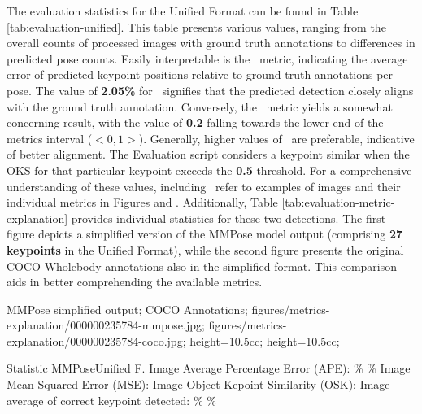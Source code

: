 The evaluation statistics for the Unified Format can be found in Table [tab:evaluation-unified]. This table presents various values, ranging from the overall counts of processed images with ground truth annotations to differences in predicted pose counts. Easily interpretable is the \APE\ metric, indicating the average error of predicted keypoint positions relative to ground truth annotations per pose. The value of {\bf 2.05\%} for \APE\ signifies that the predicted detection closely aligns with the ground truth annotation. Conversely, the \OKS\ metric yields a somewhat concerning result, with the value of {\bf 0.2} falling towards the lower end of the metrics interval ($ <0,1> $). Generally, higher values of \OKS\ are preferable, indicative of better alignment. The Evaluation script considers a keypoint similar when the OKS for that particular keypoint exceeds the {\bf 0.5} threshold. For a comprehensive understanding of these values, including \MSE\, refer to examples of images and their individual metrics in Figures  and . Additionally, Table [tab:evaluation-metric-explanation] provides individual statistics for these two detections. The first figure depicts a simplified version of the MMPose model output (comprising {\bf 27 keypoints} in the Unified Format), while the second figure presents the original COCO Wholebody annotations also in the simplified format. This comparison aids in better comprehending the available metrics.

    {
        MMPose simplified output;
        COCO Annotations;
    }
    {
        figures/metrics-explanation/000000235784-mmpose.jpg;
        figures/metrics-explanation/000000235784-coco.jpg;
    }
    {
        height=10.5cc;
        height=10.5cc;
    }

    \setupTABLE[r][1][style=bold]
    \setupTABLE[c][each][offset=3dd]
    \setupTABLE[frame=off]
    \setupTABLE[r][1][topframe=on,bottomframe=on]
    \setupTABLE[c][each][leftframe=on]
    \setupTABLE[c][1][leftframe=off]
    \setupTABLE[c][2,3][align=middle]
    \bTR\bTD Statistic                                   \eTD\bTD    MMPose\eTD\bTD     Unified F.\eTD\eTR
    \bTR\bTD Image Average Percentage Error (APE):       \eTD{}\% \eTD{}\% \eTD\eTR
    \bTR\bTD Image Mean Squared Error (MSE):             \eTD{} \eTD{} \eTD\eTR
    \bTR\bTD Image Object Kepoint Similarity (OSK):      \eTD{} \eTD{} \eTD\eTR
    \bTR\bTD Image average of correct keypoint detected: \eTD{}\% \eTD{}\% \eTD\eTR

